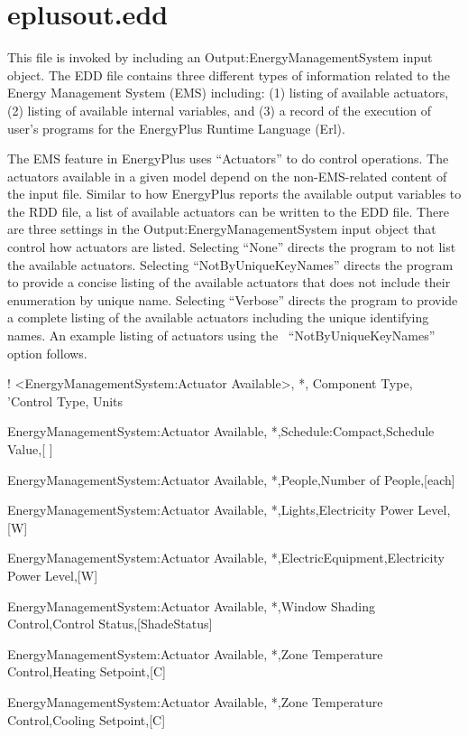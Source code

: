 \section{eplusout.edd}\label{eplusout.edd}

This file is invoked by including an Output:EnergyManagementSystem input object. The EDD file contains three different types of information related to the Energy Management System (EMS) including: (1) listing of available actuators, (2) listing of available internal variables, and (3) a record of the execution of user's programs for the EnergyPlus Runtime Language (Erl).

The EMS feature in EnergyPlus uses ``Actuators'' to do control operations. The actuators available in a given model depend on the non-EMS-related content of the input file. Similar to how EnergyPlus reports the available output variables to the RDD file, a list of available actuators can be written to the EDD file. There are three settings in the Output:EnergyManagementSystem input object that control how actuators are listed. Selecting ``None'' directs the program to not list the available actuators. Selecting ``NotByUniqueKeyNames'' directs the program to provide a concise listing of the available actuators that does not include their enumeration by unique name. Selecting ``Verbose'' directs the program to provide a complete listing of the available actuators including the unique identifying names. An example listing of actuators using the~ ``NotByUniqueKeyNames''~ option follows.

! \textless{}EnergyManagementSystem:Actuator Available\textgreater{}, *, Component Type, 'Control Type, Units

EnergyManagementSystem:Actuator Available, *,Schedule:Compact,Schedule Value,{[} {]}

EnergyManagementSystem:Actuator Available, *,People,Number of People,{[}each{]}

EnergyManagementSystem:Actuator Available, *,Lights,Electricity Power Level,{[}W{]}

EnergyManagementSystem:Actuator Available, *,ElectricEquipment,Electricity Power Level,{[}W{]}

EnergyManagementSystem:Actuator Available, *,Window Shading Control,Control Status,{[}ShadeStatus{]}

EnergyManagementSystem:Actuator Available, *,Zone Temperature Control,Heating Setpoint,{[}C{]}

EnergyManagementSystem:Actuator Available, *,Zone Temperature Control,Cooling Setpoint,{[}C{]}


